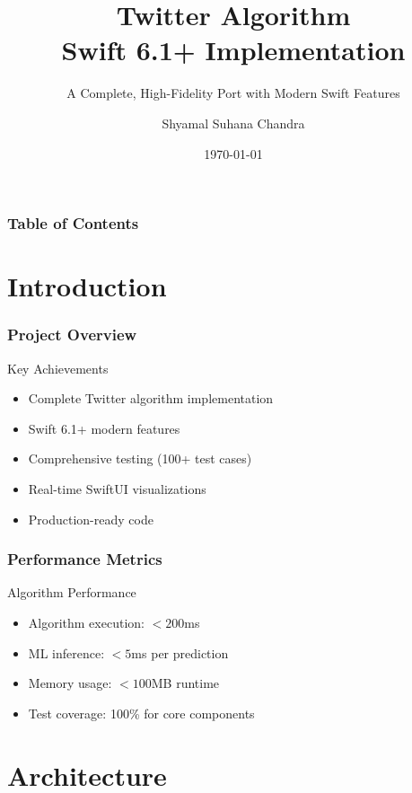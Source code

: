 \documentclass[aspectratio=169]{beamer}
\title[Twitter Algorithm Swift 6.1+]{Twitter Algorithm\\Swift 6.1+ Implementation}
\subtitle{A Complete, High-Fidelity Port with Modern Swift Features}
\author{Shyamal Suhana Chandra}
\institute{Swift 6.1+ Development}
\date{\today}
\begin{document}
\begin{frame}
    \titlepage
\end{frame}

\begin{frame}
    \frametitle{Table of Contents}
    \tableofcontents
\end{frame}

\section{Introduction}

\begin{frame}
    \frametitle{Project Overview}
    \begin{block}{Key Achievements}
        \begin{itemize}
            \item Complete Twitter algorithm implementation
            \item Swift 6.1+ modern features
            \item Comprehensive testing (100+ test cases)
            \item Real-time SwiftUI visualizations
            \item Production-ready code
        \end{itemize}
    \end{block}
\end{frame}

\begin{frame}
    \frametitle{Performance Metrics}
    \begin{block}{Algorithm Performance}
        \begin{itemize}
            \item Algorithm execution: $< 200$ms
            \item ML inference: $< 5$ms per prediction
            \item Memory usage: $< 100$MB runtime
            \item Test coverage: 100\% for core components
        \end{itemize}
    \end{block}
\end{frame}

\section{Architecture}
\end{document}
